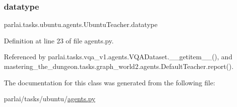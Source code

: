 \subsubsection{\texorpdfstring{datatype}{datatype}}
{\footnotesize\ttfamily parlai.\+tasks.\+ubuntu.\+agents.\+Ubuntu\+Teacher.\+datatype}



Definition at line 23 of file agents.\+py.



Referenced by parlai.\+tasks.\+vqa\+\_\+v1.\+agents.\+V\+Q\+A\+Dataset.\+\_\+\+\_\+getitem\+\_\+\+\_\+(), and mastering\+\_\+the\+\_\+dungeon.\+tasks.\+graph\+\_\+world2.\+agents.\+Default\+Teacher.\+report().



The documentation for this class was generated from the following file\+:\begin{DoxyCompactItemize}
\item 
parlai/tasks/ubuntu/\hyperlink{parlai_2tasks_2ubuntu_2agents_8py}{agents.\+py}\end{DoxyCompactItemize}
